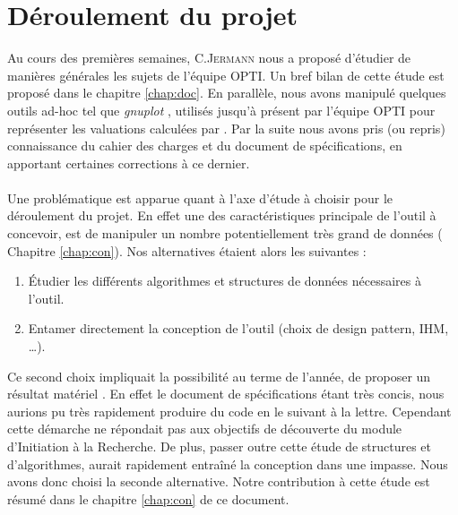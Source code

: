 \section{Déroulement du projet}
Au cours des premières semaines, C.\textsc{Jermann} nous a proposé d'étudier de manières générales les sujets de l'équipe \textsc{OPTI}. Un bref bilan de cette étude est proposé dans le chapitre \ref{chap:doc}. En parallèle, nous avons manipulé quelques outils ad-hoc tel que \emph{gnuplot} \cite{gnu}, utilisés jusqu'à présent par l'équipe \textsc{OPTI} pour représenter les valuations calculées par \realpaver. Par la suite nous avons pris (ou repris) connaissance du cahier des charges et du document de spécifications, en apportant certaines corrections à ce dernier. 

\paragraph{}Une problématique est apparue quant à l'axe d'étude à choisir pour le déroulement du projet. En effet une des caractéristiques principale de l'outil à concevoir, est de manipuler un nombre potentiellement très grand de données (\cf{} Chapitre \ref{chap:con}). Nos alternatives étaient alors les suivantes : 
\begin{enumerate}
\item
Étudier les différents algorithmes et structures de données nécessaires à l'outil.
\item
Entamer directement la conception de l'outil (choix de design pattern, IHM, \dots).
\end{enumerate} 
Ce second choix impliquait la possibilité au terme de l'année, de proposer un résultat \og matériel \fg{}. En effet le document de spécifications étant très concis, nous aurions pu très rapidement produire du code en le suivant à la lettre. Cependant cette démarche ne répondait pas aux objectifs de découverte du module d'Initiation à la Recherche. De plus, passer outre cette étude de structures et d'algorithmes, aurait rapidement entraîné la conception dans une impasse. Nous avons donc choisi la seconde alternative. Notre contribution à cette étude est résumé dans le chapitre \ref{chap:con} de ce document.


